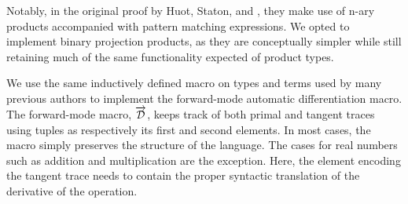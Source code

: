 \documentclass[11pt, final]{article}
\begin{document}
  Notably, in the original proof by Huot, Staton, and \Vakar{} \cite{huot2020correctness}, they make use of n-ary products accompanied with pattern matching expressions.
  We opted to implement binary projection products, as they are conceptually simpler while still retaining much of the same functionality expected of product types.





  We use the same inductively defined macro on types and terms used by many previous authors to implement the forward-mode automatic differentiation macro\cite{huot2020correctness}\cite{barthe2020versatility}\cite{Shaikha2019}.
  The forward-mode macro, $\overrightarrow{\mathcal{D}}$, keeps track of both primal and tangent traces using tuples as respectively its first and second elements.
  In most cases, the macro simply preserves the structure of the language.
  The cases for real numbers such as addition and multiplication are the exception.
  Here, the element encoding the tangent trace needs to contain the proper syntactic translation of the derivative of the operation.
\end{document}
